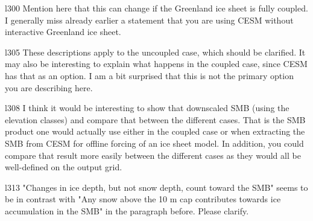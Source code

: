 \documentclass[12pt,oneside,a4paper]{article}%
\begin{document}
{\color{blue}{This has been modified in the reworked section.}} \newline

l300 Mention here that this can change if the Greenland ice sheet is fully coupled. I generally miss already earlier a statement that you are using CESM without interactive Greenland ice sheet. \newline

{\color{blue}{This is a good catch and the language has been inserted about how this changes with an active ice sheet.}} \newline

l305 These descriptions apply to the uncoupled case, which should be clarified. It may also be interesting to explain what happens in the coupled case, since CESM has that as an option. I am a bit surprised that this is not the primary option you are describing here. \newline

{\color{blue}{After addressing your last comment, we believe the paragraph is valid for both coupled and un-coupled cases.}} \newline

l308 I think it would be interesting to show that downscaled SMB (using the elevation classes) and compare that between the different cases. That is the SMB product one would actually use either in the coupled case or when extracting the SMB from CESM for offline forcing of an ice sheet model. In addition, you could compare that result more easily between the different cases as they would all be well-defined on the output grid. \newline

{\color{blue}{We agree that would be interesting. The reason we didn't employ this approach -- which to be clear, we interpret as evaluating the SMB field downscaled to the 4km CISM grid -- is that only the SMB is downscaled. It is the resolution sensitivity of the individual components of the SMB that is the main focus of this study. It's representation on the CLM grid is still quite advanced, owing to the EC scheme. I suppose we could have tried to hack the code to downscale the SMB components to CISM, but we didn't go down that road (and no telling the number of issues that would've cropped up going down that road). That said, our approach of mapping to the common ice mask is quite complicated as well.}} \newline

l313 "Changes in ice depth, but not snow depth, count toward the SMB" seems to be in contrast with "Any snow above the 10 m cap contributes towards ice accumulation in the SMB" in the paragraph before. Please clarify. \newline
\end{document}
